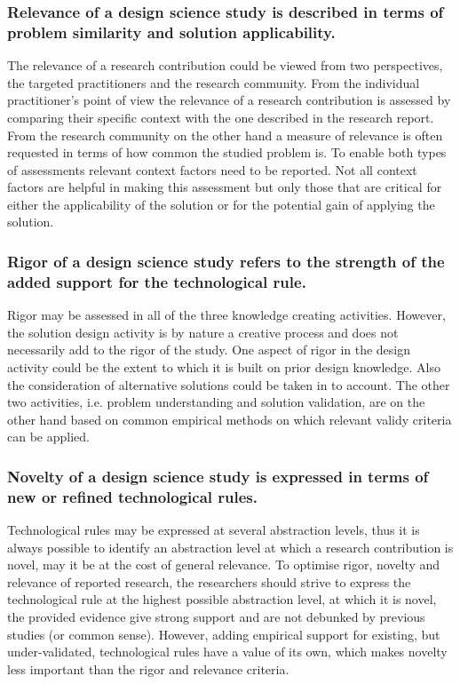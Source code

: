 \documentclass[graybox]{svmult}
\begin{document}
\subsubsection{Relevance of a design science study is described in terms of problem similarity and solution applicability.} The relevance of a research contribution could be viewed from two perspectives, the targeted practitioners and the research community. From the individual practitioner's point of view the relevance of a research contribution is assessed by comparing their specific context with the one described in the research report. From the research community on the other hand a measure of relevance is often requested in terms of how common the studied problem is. To enable both types of assessments relevant context factors need to be reported. Not all context factors are helpful in making this assessment but only those that are critical for either the applicability of the solution or for the potential gain of applying the solution. 


\subsubsection{Rigor of a design science study refers to the strength of the added support for the technological rule.} Rigor may be assessed in all of the three knowledge creating activities. However, the solution design activity is by nature a creative process and does not necessarily add to the rigor of the study. One aspect of rigor in the design activity could be the extent to which it is built on prior design knowledge. Also the consideration of alternative solutions could be taken in to account. The other two activities, i.e. problem understanding and solution validation, are on the other hand based on common empirical methods on which relevant validy criteria can be applied. 

\subsubsection{Novelty of a design science study is expressed in terms of new or refined technological rules.} Technological rules may be expressed at several abstraction levels, thus it is always possible to identify an abstraction level at which a research contribution is novel, may it be at the cost of general relevance. To optimise rigor, novelty and relevance of reported research, the researchers should strive to express the technological rule at the highest possible abstraction level, at which it is novel, the provided evidence give strong support and are not debunked by previous studies (or common sense). However, adding empirical support for existing, but under-validated, technological rules have a value of its own, which makes novelty less important than the rigor and relevance criteria.
\end{document}
